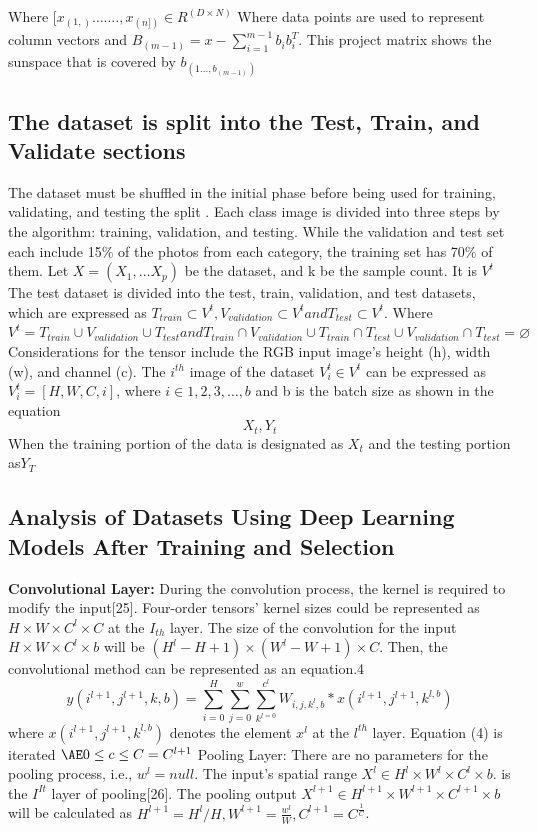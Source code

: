 \documentclass[a4paper,fleqn]{cas-sc}
\begin{document}
    Where $[x_(1,)…….,x_(n])  \in R^(D×N)$ Where data points are used to represent column vectors and $B_(m-1)=x-\sum_{i=1}^{m-1} b_i b_i^T$. This project matrix shows the sunspace that is covered by $b_(1 \dots,b_(m-1) )$

\subsection{The dataset is split into the Test, Train, and Validate sections}
The dataset must be shuffled in the initial phase before being used for training, validating, and testing the split \cite{joseph2022split, goos2003d, berk1984validating}. Each class image is divided into three steps by the algorithm: training, validation, and testing. While the validation and test set each include 15\% of the photos from each category, the training set has 70\% of them. Let $ X=(X_1,\dots X_p)$ be the dataset, and k be the sample count. It is  $V^t$ The test dataset is divided into the test, train, validation, and test datasets, which are expressed as $T_{train} \subset V^t,V_{validation} \subset V^t and T_{test} \subset V^t$. Where $V^t=T_{train}\cup V_{validation}\cup T_{test} and {T_{train} \cap V_{validation} }\cup {T_{train}\cap T_{test} } \cup {V_{validation}\cap T_{test} }=\varnothing $ Considerations for the tensor include the RGB input image's height (h), width (w), and channel (c). The $i^{th}$  image of the dataset ${V_i^t\in V^t }$ can be expressed as
 $V_i^t=[H,W,C,i]$, where $i \in {1,2,3, \dots,b}$ and b is the batch size as shown in the equation	                  
\begin{equation}
X_t,Y_t
\end{equation}
  When the training portion of the data is designated as $X_t$ and the testing portion as$ Y_T $


\subsection{Analysis of Datasets Using Deep Learning Models After Training and Selection}
\textbf{Convolutional Layer:} During the convolution process, the kernel is required to modify the input[25]. Four-order tensors' kernel sizes could be represented as $H × W × C^l × C$ at the $I_{th}$ layer. The size of the convolution for the input  $H × W × C^l ×  b$  will be  $(H^l-H + 1) × (W^l- W + 1) × C$. Then, the convolutional method can be represented as an equation.4
\begin{equation}
y(i^{l+1},j^{l+1},k,b)=\sum_{i=0}^H \sum_{j=0}^w \sum_{k^{l=0}}^{c^l}W_{i,j,k^l,b}*x(i^{l+1},j^{l+1},k^{l,b})
\end{equation}
where $x(i^{l+1},j^{l+1},k^{l,b})$ denotes the element $x^l$ at the $l^{th}$ layer. Equation (4) is iterated $\AE 0 \leq c \leq C = C^{l+1}$ Pooling Layer: There are no parameters for the pooling process, i.e., $w^l = null$. The input's spatial range $X^l \in H^l × W^l × C^l × b$.   is the $I^{It}$ layer of  pooling[26]. The pooling output $X^{l+1} \in H^{l+1} × W^{l+1} × C^{l+1} × b$ will  be calculated as $H^{l+1} = H^l/H , W^{l+1}=\frac{w^l}{W} ,C^{l+1}=C^\frac{1}{C} $. 
\end{document}
